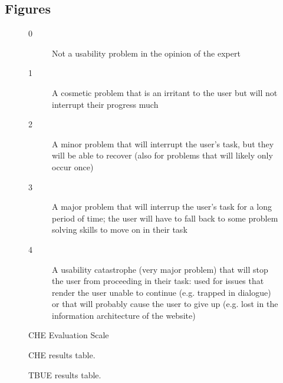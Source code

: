 \begin{appendices}
  \section{Figures}
  \begin{center}

    \begin{figure}[htbp]
      \begin{description}
      \item[0] \hspace{2mm} Not a usability problem in the opinion of the expert
      \item[1] \hspace{2mm} A cosmetic problem that is an irritant to the user but will not interrupt their progress much
      \item[2] \hspace{2mm} A minor problem that will interrupt the user's task, but they will be able to recover (also for problems that will likely only occur once)
      \item[3] \hspace{2mm} A major problem that will interrup the user's task for a long period of time; the user will have to fall back to some problem solving skills to move on in their task
      \item[4] \hspace{2mm} A usability catastrophe (very major problem) that will stop the user from proceeding in their task: used for issues that render the user unable to continue (e.g. trapped in dialogue) or that will probably cause the user to give up (e.g. lost in the information architecture of the website)
      \end{description}
      \caption{CHE Evaluation Scale}
      \label{che1}
    \end{figure}

    \begin{figure}[htbp]
      
      \caption{CHE results table.}
      \label{che2}
    \end{figure}
    

    

    \begin{figure}[htbp]
      
      \caption{TBUE results table.}
      \label{tbue1}
    \end{figure}

  \end{center}
\end{appendices}
